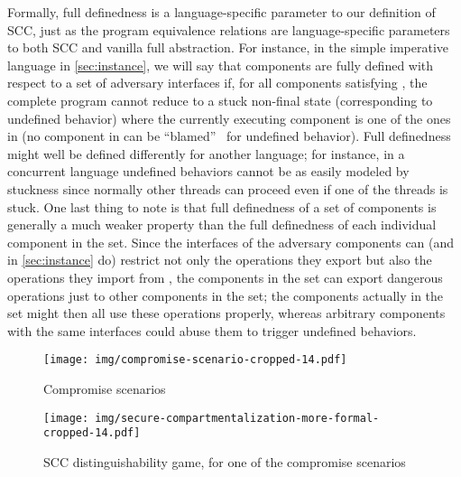 \documentclass[10pt, conference, compsocconf, letterpaper, times]{IEEEtran}
\begin{document}
Formally, full definedness is a language-specific parameter to our
definition of SCC, just as the program equivalence relations are
language-specific parameters to both SCC and vanilla full abstraction.
For instance, in the simple imperative language in
\autoref{sec:instance}, we will say that components 
are fully defined with respect to a set of adversary interfaces
 if, for all components  
satisfying , the complete program
 cannot reduce
to a stuck non-final state (corresponding to undefined behavior) where
the currently executing component is one of the ones in
 (\IE no component in  can be
``blamed''~\cite{FindlerF02prime} for undefined behavior).
Full definedness might well be defined differently for another
language; for instance, in a concurrent language undefined behaviors
cannot be as easily modeled by stuckness since normally other threads
can proceed even if one of the threads is stuck.
One last thing to note is that full definedness of a set of components is
generally a much weaker property than the full definedness of each
individual component in the set. Since the interfaces of
the adversary components  can (and in \autoref{sec:instance} do)
restrict not only the operations they export but also the operations they
import from , the components in the set can export dangerous
operations just to other components in the set; the components actually in
the set might then all use these operations properly, whereas arbitrary
components with the same interfaces could abuse them to trigger undefined
behaviors.



\begin{figure}
\centering
\texttt{[image: img/compromise-scenario-cropped-14.pdf]}
\caption{Compromise scenarios}
\label{fig:compromise-scenario}
\end{figure}
\begin{figure}[t!]
\centering
\texttt{[image: img/secure-compartmentalization-more-formal-cropped-14.pdf]}
\caption{SCC distinguishability game, for one of the
  compromise scenarios\ifsooner{}\fi}
\label{fig:secure-compartmentalization-more-formal}
\end{figure}
\end{document}
